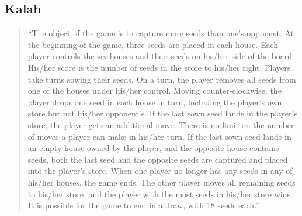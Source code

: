 \subsection{Kalah}


\begin{quote}
``The object of the game is to capture more seeds than one's opponent.
At the beginning of the game, three seeds are placed in each house.
Each player controls the six houses and their seeds on his/her side of the board. His/her score is the number of seeds in the store to his/her right.
Players take turns sowing their seeds. On a turn, the player removes all seeds from one of the houses under his/her control. Moving counter-clockwise, the player drops one seed in each house in turn, including the player's own store but not his/her opponent's.
If the last sown seed lands in the player's store, the player gets an additional move. There is no limit on the number of moves a player can make in his/her turn.
If the last sown seed lands in an empty house owned by the player, and the opposite house contains seeds, both the last seed and the opposite seeds are captured and placed into the player's store.
When one player no longer has any seeds in any of his/her houses, the game ends. The other player moves all remaining seeds to his/her store, and the player with the most seeds in his/her store wins.
It is possible for the game to end in a draw, with 18 seeds each.''
\end{quote} %


